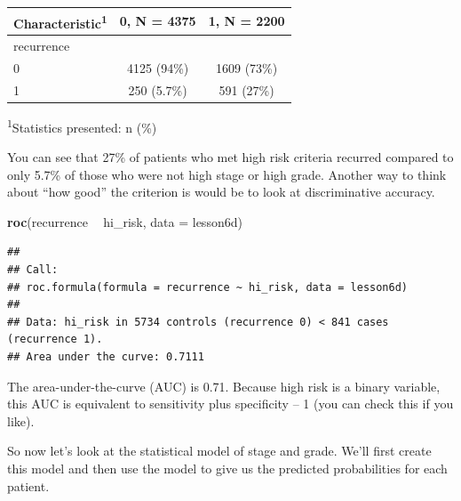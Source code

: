 \documentclass[]{book}
\newenvironment{Shaded}{\begin{snugshade}}{\end{snugshade}}
\newcommand{\DataTypeTok}[1]{\textcolor[rgb]{0.13,0.29,0.53}{#1}}
\newcommand{\KeywordTok}[1]{\textcolor[rgb]{0.13,0.29,0.53}{\textbf{#1}}}
\newcommand{\NormalTok}[1]{#1}
\newcommand{\OperatorTok}[1]{\textcolor[rgb]{0.81,0.36,0.00}{\textbf{#1}}}
\newcommand{\StringTok}[1]{\textcolor[rgb]{0.31,0.60,0.02}{#1}}
\begin{document}
\captionsetup[table]{labelformat=empty,skip=1pt}
\begin{longtable}{lcc}
\toprule
\textbf{Characteristic}\textsuperscript{1} & \textbf{0}, N = 4375 & \textbf{1}, N = 2200 \\ 
\midrule
recurrence &  &  \\ 
0 & 4125 (94\%) & 1609 (73\%) \\ 
1 & 250 (5.7\%) & 591 (27\%) \\ 
\bottomrule
\end{longtable}
\vspace{-5mm}
\begin{minipage}{\linewidth}
\textsuperscript{1}Statistics presented: n (\%) \\ 
\end{minipage}

You can see that 27\% of patients who met high risk criteria recurred
compared to only 5.7\% of those who were not high stage or high grade.
Another way to think about ``how good'' the criterion is would be to
look at discriminative accuracy.

\begin{Shaded}
\begin{Highlighting}[]
\KeywordTok{roc}\NormalTok{(recurrence }\OperatorTok{~}\StringTok{ }\NormalTok{hi_risk, }\DataTypeTok{data =}\NormalTok{ lesson6d)}
\end{Highlighting}
\end{Shaded}

\begin{verbatim}
## 
## Call:
## roc.formula(formula = recurrence ~ hi_risk, data = lesson6d)
## 
## Data: hi_risk in 5734 controls (recurrence 0) < 841 cases (recurrence 1).
## Area under the curve: 0.7111
\end{verbatim}

The area-under-the-curve (AUC) is 0.71. Because high risk is a binary
variable, this AUC is equivalent to sensitivity plus specificity -- 1
(you can check this if you like).

So now let's look at the statistical model of stage and grade. We'll
first create this model and then use the model to give us the predicted
probabilities for each patient.
\end{document}
